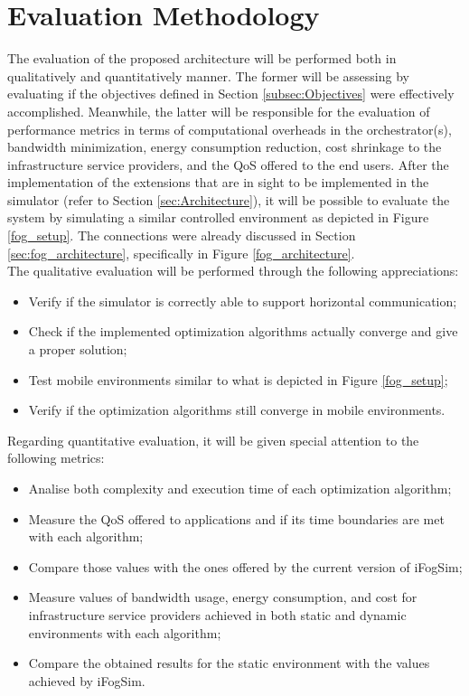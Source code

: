 \chapter{Evaluation Methodology}
\label{sec:Evaluation}
The evaluation of the proposed architecture will be performed both in qualitatively and quantitatively manner. The former will be assessing by evaluating if the objectives defined in Section \ref{subsec:Objectives} were effectively accomplished. Meanwhile, the latter will be responsible for the evaluation of performance metrics in terms of computational overheads in the orchestrator(s), bandwidth minimization, energy consumption reduction, cost shrinkage to the infrastructure service providers, and the QoS offered to the end users. After the implementation of the extensions that are in sight to be implemented in the simulator (refer to Section \ref{sec:Architecture}), it will be possible to evaluate the system by simulating a similar controlled environment as depicted in Figure \ref{fog_setup}. The connections were already discussed in Section \ref{sec:fog_architecture}, specifically in Figure \ref{fog_architecture}.\\
\noindent\tab The qualitative evaluation will be performed through the following appreciations:
\begin{itemize}[noitemsep]
	\item Verify if the simulator is correctly able to support horizontal communication;%
	\item Check if the implemented optimization algorithms actually converge and give a proper solution;
	\item Test mobile environments similar to what is depicted in Figure \ref{fog_setup};
	\item Verify if the optimization algorithms still converge in mobile environments.
\end{itemize}
\noindent\tab Regarding quantitative evaluation, it will be given special attention to the following metrics:
\begin{itemize}[noitemsep]
	\item Analise both complexity and execution time of each optimization algorithm;
	\item Measure the QoS offered to applications and if its time boundaries are met with each algorithm;
	\item Compare those values with the ones offered by the current version of iFogSim; %
	\item Measure values of bandwidth usage, energy consumption, and cost for infrastructure service providers achieved in both static and dynamic environments with each algorithm;
	\item Compare the obtained results for the static environment with the values achieved by iFogSim.
\end{itemize}
